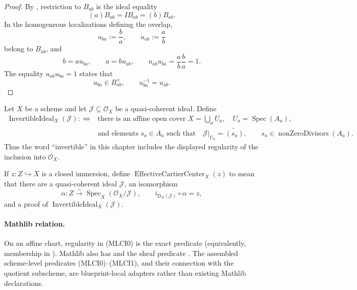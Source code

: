 \begin{proof}
  By , restriction to
  $B_{ab}$ is the ideal equality
  \[
    (a)B_{ab}=IB_{ab}=(b)B_{ab}.
  \]
  In the homogeneous localizations defining the overlap,
  \[
    u_{ba}:=\frac{b}{a},\qquad u_{ab}:=\frac{a}{b}
  \]
  belong to $B_{ab}$, and
  \[
    b=au_{ba},\qquad a=bu_{ab},\qquad
    u_{ab}u_{ba}=\frac ab\frac ba=1.
  \]
  The equality $u_{ab}u_{ba}=1$ states that
  \[
    u_{ba}\in B_{ab}^\times,
    \qquad u_{ba}^{-1}=u_{ab}.
  \]
\end{proof}

\begin{definition}
  \label{def:nagata-invertible-ideal-effective-cartier}

  Let $X$ be a scheme and let
  $\mathcal J\subseteq\mathcal O_X$ be a quasi-coherent ideal.  Define
  \[
  \begin{aligned}
    \operatorname{InvertibleIdeal}_X(\mathcal J)
      :\Longleftrightarrow{}&
      \text{there is an affine open cover }X=\bigcup_aU_a,\quad
      U_a=\operatorname{Spec}(A_a),\\
      &\text{and elements }s_a\in A_a\text{ such that}\quad
      \mathcal J|_{U_a}=\widetilde{(s_a)},\qquad
      s_a\in\operatorname{nonZeroDivisors}(A_a).
  \end{aligned}                                                   \tag{MLCI0}
  \]
  Thus the word ``invertible'' in this chapter includes the displayed
  regularity of the inclusion into $\mathcal O_X$.

  If $z\colon Z\hookrightarrow X$ is a closed immersion, define
  \(\operatorname{EffectiveCartierCenter}_X(z)\) to mean that there are a
  quasi-coherent ideal $\mathcal J$, an isomorphism
  \[
    \alpha\colon
      Z\xrightarrow{\sim}
      \operatorname{Spec}_X(\mathcal O_X/\mathcal J),
    \qquad
    i_{\mathsf D_X(\mathcal J)}\circ\alpha=z,                    \tag{MLCI1}
  \]
  and a proof of
  $\operatorname{InvertibleIdeal}_X(\mathcal J)$.

  \paragraph{Mathlib relation.}
  On an affine chart, regularity in (MLCI0) is the exact predicate
  \texttt{} (equivalently, membership in
  \texttt{}).  Mathlib also has
  \texttt{} and the sheaf predicate
  \texttt{}.  The assembled
  scheme-level predicates (MLCI0)--(MLCI1), and their connection with the
  quotient subscheme, are blueprint-local adapters rather than existing
  Mathlib declarations.
\end{definition}

